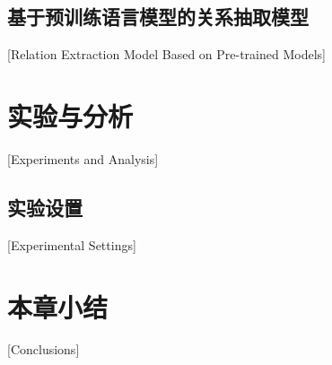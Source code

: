\subsection{基于预训练语言模型的关系抽取模型}[Relation Extraction Model Based on Pre-trained Models]


\section{实验与分析}[Experiments and Analysis]

\subsection{实验设置}[Experimental Settings]


\section{本章小结}[Conclusions]


